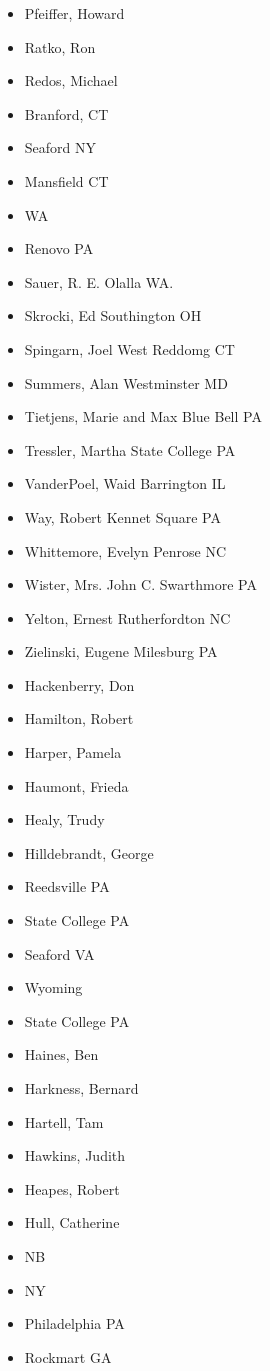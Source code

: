 \begin{itemize}
\item Pfeiffer, Howard
\item Ratko, Ron
\item Redos, Michael
\item Branford, CT
\item Seaford NY
\item Mansfield CT
\item WA
\item Renovo PA
\item Sauer, R. E. Olalla WA.
\item Skrocki, Ed Southington OH
\item Spingarn, Joel West Reddomg CT
\item Summers, Alan Westminster MD
\item Tietjens, Marie and Max Blue Bell PA
\item Tressler, Martha State College PA
\item VanderPoel, Waid Barrington IL
\item Way, Robert Kennet Square PA
\item Whittemore, Evelyn Penrose NC
\item Wister, Mrs. John C. Swarthmore PA
\item Yelton, Ernest Rutherfordton NC
\item Zielinski, Eugene Milesburg PA
\item Hackenberry, Don
\item Hamilton, Robert
\item Harper, Pamela
\item Haumont, Frieda
\item Healy, Trudy
\item Hilldebrandt, George
\item Reedsville PA
\item State College PA
\item Seaford VA
\item Wyoming
\item State College PA
\item Haines, Ben
\item Harkness, Bernard
\item Hartell, Tam
\item Hawkins, Judith
\item Heapes, Robert
\item Hull, Catherine
\item NB
\item NY
\item Philadelphia PA
\item Rockmart GA

\end{itemize}
